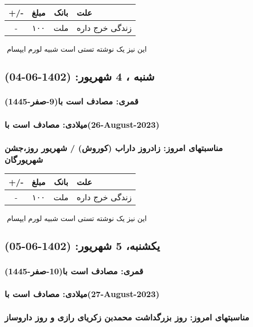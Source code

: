 \documentclass{article}
\newcommand{\rnote}[1]{\marginpar{\textcolor{color}{\StrSubstitute{\##1}{ }{\_}}}}
\newcommand{\myRow}[4]{
    #1 & #2 & #3 & #4 \\ \hline
}
\begin{document}
\begin{tabular}{ | c | c | c | p{5cm} |}
    \hline
    \myRow{ +/- }{مبلغ}{بانک}{علت}
    \myRow{-}{۱۰۰}{ملت}{زندگی خرج داره}
\end{tabular}
\newline
\newline

‌
\rnote{تست}
این نیز یک نوشته تستی است شبیه لورم ایپسام




\newpage
{}
\textcolor{color}{
\section{ شنبه ، 4 شهریور: (1402-06-04) }
\subsubsection*{قمری: مصادف است با(9-صفر-1445)} 
\subsubsection*{میلادی: مصادف است با(26-August-2023)}
\subsubsection*{مناسبتهای امروز: زادروز داراب (کوروش) / شهریور روز،جشن شهریورگان}
}


\begin{tabular}{ | c | c | c | p{5cm} |}
    \hline
    \myRow{ +/- }{مبلغ}{بانک}{علت}
    \myRow{-}{۱۰۰}{ملت}{زندگی خرج داره}
\end{tabular}
\newline
\newline

‌
\rnote{تست}
این نیز یک نوشته تستی است شبیه لورم ایپسام




\newpage
{}
\textcolor{color}{
\section{ یکشنبه، 5 شهریور: (1402-06-05) }
\subsubsection*{قمری: مصادف است با(10-صفر-1445)} 
\subsubsection*{میلادی: مصادف است با(27-August-2023)}
\subsubsection*{مناسبتهای امروز: روز بزرگداشت محمدبن زکریای رازی و روز داروساز}
}
\end{document}
